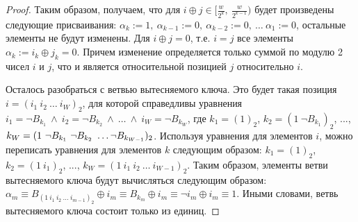 \begin{proof}
  Таким образом, получаем, что для $i \oplus j \in
  [\frac{w}{2^k},~\frac{w}{2^{k-1}})$ будет произведены следующие
  присваивания: $\alpha_k := 1,~\alpha_{k-1} := 0,~\alpha_{k-2} :=
  0,~\dots~\alpha_1 := 0$, остальные элементы не будут изменены. Для
  $i \oplus j = 0$, т.е. $i = j$ все элементы $\alpha_k := i_k \oplus
  j_k = 0$. Причем изменение определяется только суммой по модулю 2
  чисел $i$ и $j$, что и является относительной позицией $j$
  относительно $i$.

  Осталось разобраться с ветвью вытесняемого ключа. Это будет такая
  позиция $i = (i_1~i_2~\dots~i_W)_2$, для которой справедливы
  уравнения $i_1 = \neg B_{k_1}~\wedge~i_2 = \neg
  B_{k_2}~\wedge~\dots~\wedge~i_W = \neg B_{k_W}$, где $k_1 = (1)_2$,
  $k_2 = (1~\neg B_{k_1})_2$, ..., $k_W = (1~\neg B_{k_1}~\neg
  B_{k_2}~\dots\\\neg B_{k_{W-1}})_2$. Используя уравнения для
  элементов $i$, можно переписать уравнения для элементов $k$
  следующим образом: $k_1 = (1)_2$,
  $k_2 = (1~i_1)_2$, ..., $k_W = (1~i_1~i_2~\dots~i_{W-1})_2$. Таким
  образом, элементы ветви вытесняемого ключа будут вычисляться
  следующим образом: $\alpha_m \equiv B_{(1~i_1~i_2~\dots~i_{m-1})_2}
  \oplus i_m \equiv B_{k_m} \oplus i_m \equiv \neg i_m \oplus i_m
  \equiv 1$. Иными словами, ветвь вытесняемого ключа состоит только
  из единиц.
\end{proof}

